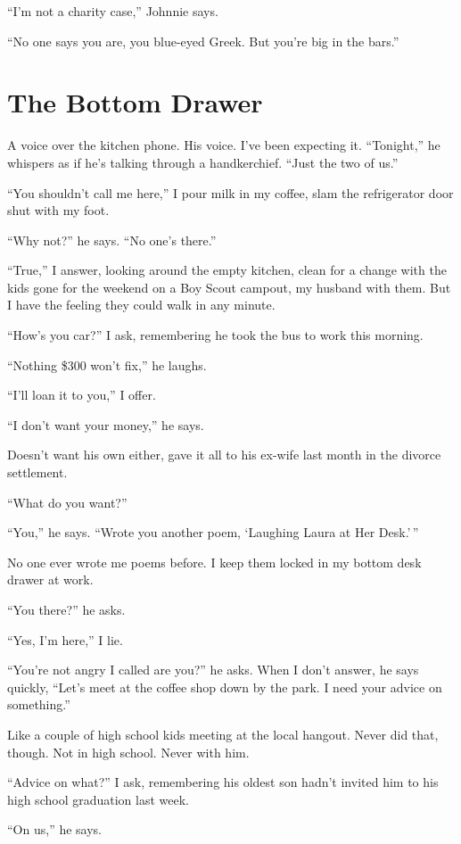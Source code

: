 \documentclass[twoside,10pt]{book}
\begin{document}
``I'm not a charity case,'' Johnnie says.

``No one says you are, you blue-eyed Greek. But you're big in the
bars.''

\cleardoublepage
\chapter{The Bottom Drawer}

A voice over the kitchen phone. His voice. I've been expecting it.
``Tonight,'' he whispers as if he's talking through a handkerchief.
``Just the two of us.''

``You shouldn't call me here,'' I pour milk in my coffee, slam the
refrigerator door shut with my foot.

``Why not?'' he says. ``No one's there.''

``True,'' I answer, looking around the empty kitchen, clean for a change
with the kids gone for the weekend on a Boy Scout campout, my husband
with them. But I have the feeling they could walk in any minute.

``How's you car?'' I ask, remembering he took the bus to work this
morning.

``Nothing \$300 won't fix,'' he laughs.

``I'll loan it to you,'' I offer.

``I don't want your money,'' he says.

Doesn't want his own either, gave it all to his ex-wife last month in
the divorce settlement.

``What do you want?''

``You,'' he says. ``Wrote you another poem, `Laughing Laura at Her
Desk.'\,''

No one ever wrote me poems before. I keep them locked in my bottom desk
drawer at work.

``You there?'' he asks.

``Yes, I'm here,'' I lie.

``You're not angry I called are you?'' he asks. When I don't answer, he
says quickly, ``Let's meet at the coffee shop down by the park. I need
your advice on something.''

Like a couple of high school kids meeting at the local hangout. Never
did that, though. Not in high school. Never with him.

``Advice on what?'' I ask, remembering his oldest son hadn't invited him
to his high school graduation last week.

``On us,'' he says.
\end{document}
